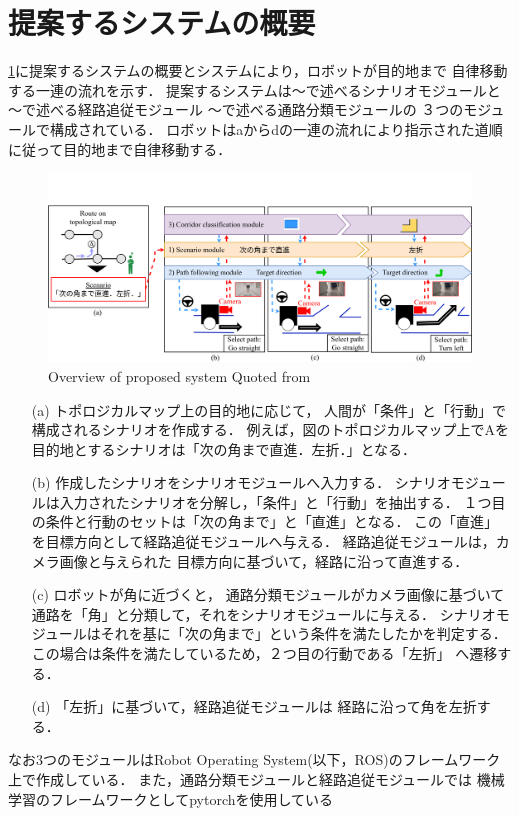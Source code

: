 \section{提案するシステムの概要}
\ref{fig:abs}に提案するシステムの概要とシステムにより，ロボットが目的地まで
自律移動する一連の流れを示す．
提案するシステムは〜で述べるシナリオモジュールと
〜で述べる経路追従モジュール
〜で述べる通路分類モジュールの
３つのモジュールで構成されている．
ロボットはaからdの一連の流れにより指示された道順に従って目的地まで自律移動する．

\begin{figure}[htbp]
    \centering
     \includegraphics[width=130mm]{images/pdf/absv3.pdf}
     \caption{Overview of proposed system Quoted from \cite{haruyama2023}}\label{fig:abs}
\end{figure}
\newpage
\begin{enumerate}
    \item [(a)] トポロジカルマップ上の目的地に応じて，
    人間が「条件」と「行動」で構成されるシナリオを作成する．
    例えば，図のトポロジカルマップ上でAを目的地とするシナリオは「次の角まで直進．左折．」となる．
    \item [(b)] 作成したシナリオをシナリオモジュールへ入力する．
    シナリオモジュールは入力されたシナリオを分解し，「条件」と「行動」を抽出する．
    １つ目の条件と行動のセットは「次の角まで」と「直進」となる．
    この「直進」を目標方向として経路追従モジュールへ与える．
    経路追従モジュールは，カメラ画像と与えられた
    目標方向に基づいて，経路に沿って直進する．
    \item [(c)] ロボットが角に近づくと，
    通路分類モジュールがカメラ画像に基づいて
    通路を「角」と分類して，それをシナリオモジュールに与える．
    シナリオモジュールはそれを基に「次の角まで」という条件を満たしたかを判定する．
    この場合は条件を満たしているため，２つ目の行動である「左折」
    へ遷移する．
    \item [(d)]「左折」に基づいて，経路追従モジュールは
    経路に沿って角を左折する．
\end{enumerate}

なお3つのモジュールはRobot Operating System(以下，ROS)\cite{ros}のフレームワーク上で作成している．
また，通路分類モジュールと経路追従モジュールでは
機械学習のフレームワークとしてpytorch\cite{torch}を使用している
